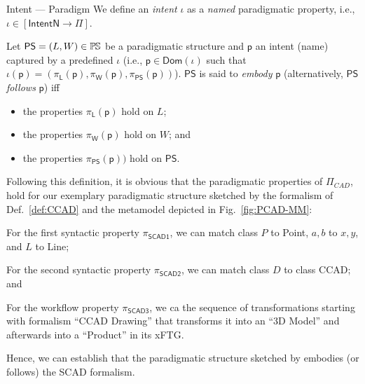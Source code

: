 \begin{Definition}{\label{def:Paradigm}Intent --- Paradigm}
We define an \emph{intent} $\iota$ as a \emph{named} paradigmatic property, 
i.e., $\iota \in [\mathsf{IntentN} \to \Pi]$.

   Let $\mathsf{PS} = (L, W)\in\mathbb{P}\mskip-1mu\mathbb{S}$ be a paradigmatic structure and 
$\mathsf{p}$ an intent (name) captured by a predefined $\iota$ (i.e., 
$\mathsf{p}\in \mathsf{Dom}(\iota)$ such that 
$\iota(\mathsf{p}) = (\pi_{\mathsf{L}}(\mathsf{p}), 
                     \pi_{\mathsf{W}}(\mathsf{p}), 
                     \pi_{\mathsf{PS}}(\mathsf{p}))$). 
$\mathsf{PS}$ is said to \emph{embody} $\mathsf{p}$ (alternatively, 
$\mathsf{PS}$ \emph{follows} $\mathsf{p}$) iff 
\begin{itemize}
   \item the properties $\pi_{\mathsf{L}}(\mathsf{p})$ hold on $L$;
   \item the properties $\pi_{\mathsf{W}}(\mathsf{p})$ hold on $W$; and
   \item the properties $ \pi_{\mathsf{PS}}(\mathsf{p}))$ hold on $\mathsf{PS}$.
\end{itemize}
\end{Definition}

\begin{Example}
\end{Example}

Following this definition, it is obvious that the paradigmatic properties of
$\Pi_{CAD}$, hold for our exemplary \CCad paradigmatic structure sketched by the
formalism of Def.~\ref{def:CCAD} and the metamodel depicted in
Fig.~\ref{fig:PCAD-MM}:
\begin{inparaenum}[(1)]
\item For the first syntactic property $\pi_{\mathsf{SCAD1}}$, we can match
class $P$ to Point, $a,b$ to $x,y$, and $L$ to Line;
\item For the second syntactic property $\pi_{\mathsf{SCAD2}}$, we can match
class $D$ to class CCAD; and
\item For the workflow property $\pi_{\mathsf{SCAD3}}$, we ca the sequence of
transformations starting with formalism ``CCAD Drawing'' that transforms it into
an ``3D Model'' and afterwards into a ``Product'' in its xFTG.
\end{inparaenum}
Hence, we can establish that the paradigmatic structure sketched by \CCad
embodies (or follows) the SCAD formalism.


